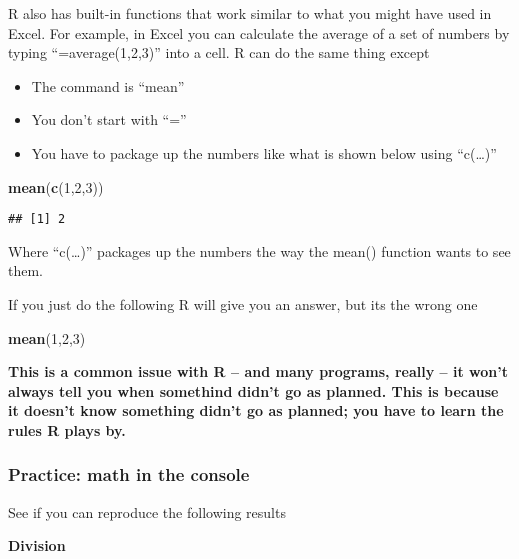 \documentclass[]{book}
\newenvironment{Shaded}{\begin{snugshade}}{\end{snugshade}}
\newcommand{\KeywordTok}[1]{\textcolor[rgb]{0.13,0.29,0.53}{\textbf{#1}}}
\newcommand{\DecValTok}[1]{\textcolor[rgb]{0.00,0.00,0.81}{#1}}
\newcommand{\NormalTok}[1]{#1}
\providecommand{\tightlist}{%
  \setlength{\itemsep}{0pt}\setlength{\parskip}{0pt}}
\theoremstyle{definition}
\theoremstyle{definition}
\theoremstyle{definition}
\theoremstyle{remark}
\begin{document}
R also has built-in functions that work similar to what you might have
used in Excel. For example, in Excel you can calculate the average of a
set of numbers by typing ``=average(1,2,3)'' into a cell. R can do the
same thing except

\begin{itemize}
\tightlist
\item
  The command is ``mean''
\item
  You don't start with ``=''
\item
  You have to package up the numbers like what is shown below using
  ``c(\ldots{})''
\end{itemize}

\begin{Shaded}
\begin{Highlighting}[]
\KeywordTok{mean}\NormalTok{(}\KeywordTok{c}\NormalTok{(}\DecValTok{1}\NormalTok{,}\DecValTok{2}\NormalTok{,}\DecValTok{3}\NormalTok{))}
\end{Highlighting}
\end{Shaded}

\begin{verbatim}
## [1] 2
\end{verbatim}

Where ``c(\ldots{})'' packages up the numbers the way the mean()
function wants to see them.

If you just do the following R will give you an answer, but its the
wrong one

\begin{Shaded}
\begin{Highlighting}[]
\KeywordTok{mean}\NormalTok{(}\DecValTok{1}\NormalTok{,}\DecValTok{2}\NormalTok{,}\DecValTok{3}\NormalTok{)}
\end{Highlighting}
\end{Shaded}

\textbf{This is a common issue with R -- and many programs, really -- it
won't always tell you when somethind didn't go as planned. This is
because it doesn't know something didn't go as planned; you have to
learn the rules R plays by.}

\subsubsection{Practice: math in the
console}\label{practice-math-in-the-console}

See if you can reproduce the following results

\textbf{Division}
\end{document}
